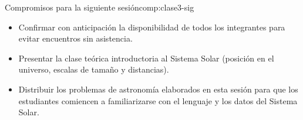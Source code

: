 \begin{compromiso}{Compromisos para la siguiente sesión}{comp:clase3-sig}
    \begin{itemize}[leftmargin=1.5em]
        \item Confirmar con anticipación la disponibilidad de todos los integrantes
              para evitar encuentros sin asistencia.
        \item Presentar la clase teórica introductoria al Sistema Solar (posición
              en el universo, escalas de tamaño y distancias).
        \item Distribuir los problemas de astronomía elaborados en esta sesión para
              que los estudiantes comiencen a familiarizarse con el lenguaje y los
              datos del Sistema Solar.
    \end{itemize}
\end{compromiso}
